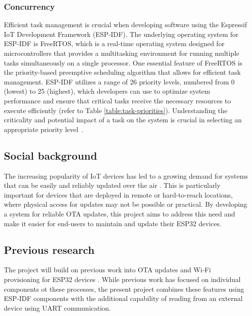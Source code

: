 \subsubsection{Concurrency}
\label{subsec:concurrency}
Efficient task management is crucial when developing software using the Espressif IoT Development Framework (ESP-IDF). The underlying operating system for ESP-IDF is FreeRTOS, which is a real-time operating system designed for microcontrollers that provides a multitasking environment for running multiple tasks simultaneously on a single processor. One essential feature of FreeRTOS is the priority-based preemptive scheduling algorithm that allows for efficient task management. ESP-IDF utilizes a range of 26 priority levels, numbered from 0 (lowest) to 25 (highest), which developers can use to optimize system performance and ensure that critical tasks receive the necessary resources to execute efficiently (refer to Table \ref{table:task-priorities}). Understanding the criticality and potential impact of a task on the system is crucial in selecting an appropriate priority level~\cite{Davis:2016}.

\subsection{Social background}
\label{sec:social}
The increasing popularity of IoT devices has led to a growing demand for systems that can be easily and reliably updated over the air \cite{Villegas:2019}. This is particularly important for devices that are deployed in remote or hard-to-reach locations, where physical access for updates may not be possible or practical. By developing a system for reliable OTA updates, this project aims to address this need and make it easier for end-users to maintain and update their ESP32 devices.

\subsection{Previous research}
\label{sec:previous}
The project will build on previous work into OTA updates and Wi-Fi provisioning for ESP32 devices \cite{espressif:esp-idf-programming-guide}. While previous work has focused on individual components ot these processes, the present project combines these features using ESP-IDF components with the additional capability of reading from an external device using UART communication.